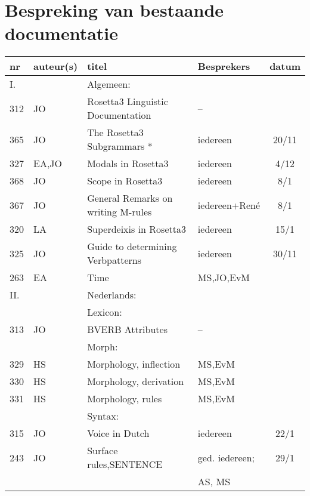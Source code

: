 \section{ Bespreking van bestaande documentatie}
\small
\begin{tabular}{llllc}
\hline
 nr  & auteur(s)  & titel                         & Besprekers      & datum\\
\hline
  I. &         & Algemeen:                                       &&\\
\hline
 312 & JO      &  Rosetta3 Linguistic Documentation        & -- & \\
 365 & JO      & The Rosetta3 Subgrammars *    & iedereen       & 20/11\\
 327 & EA,JO   & Modals in Rosetta3             & iedereen       & 4/12\\
 368 & JO      & Scope in Rosetta3              & iedereen       & 8/1\\
 367 & JO      & General Remarks on writing M-rules  & iedereen+Ren\'{e} & 8/1\\
 320 &  LA     & Superdeixis in Rosetta3        & iedereen        & 15/1\\
 325 &  JO     & Guide to determining Verbpatterns   & iedereen   & 30/11\\
 263 &  EA     & Time                           & MS,JO,EvM       & \\
\hline
II.  & &        Nederlands:                         &&\\
\hline
    &  &        Lexicon:                            &&\\
\hline
313 & JO       & BVERB Attributes                   & -- & \\
\hline
    &  &         Morph:                             &&\\
\hline
329 & HS &       Morphology, inflection             & MS,EvM & \\
330 & HS &       Morphology, derivation             & MS,EvM & \\
331 & HS &       Morphology, rules                  & MS,EvM & \\
\hline
    &      &     Syntax:                            & & \\
\hline
315 & JO       & Voice in Dutch                     & iedereen     & 22/1\\
243 & JO       & Surface rules,SENTENCE   & ged. iedereen;     & 29/1\\
    &          &                          & AS, MS             & \\

\end{tabular}
